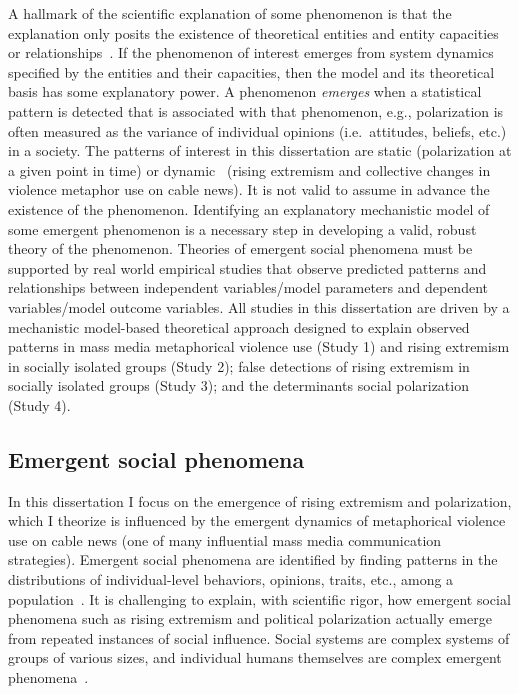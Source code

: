 \documentclass[12pt,letterpaper]{article}
\begin{document}
A hallmark of the scientific explanation of some phenomenon is that the explanation
only posits the existence of theoretical entities and entity capacities or 
relationships~\cite{Kauffman1970,Cartwright1989,Craver2006,Turner2021}. If the phenomenon of interest 
emerges from system dynamics specified by the entities and their capacities,
then the model and its theoretical basis has some explanatory power. 
A phenomenon \emph{emerges} when a statistical pattern is detected that is 
associated with that phenomenon, e.g., polarization is often measured as the
variance of individual opinions (i.e.\ attitudes, beliefs, etc.) in a society.
The patterns of interest in this dissertation are static (polarization at a given
point in time) or dynamic~\cite{Kelso1995} (rising extremism and collective changes in 
violence metaphor use on cable news).
It is not valid to assume in advance the existence of the phenomenon. Identifying
an explanatory mechanistic model of some emergent phenomenon is a necessary step
in developing a valid, robust theory of the phenomenon. Theories of emergent
social phenomena must be supported by real world empirical studies that observe predicted patterns and 
relationships between independent variables/model parameters and dependent variables/model outcome variables.
All studies in this dissertation are driven by a mechanistic model-based theoretical
approach designed to explain observed patterns in mass media metaphorical violence use (Study 1) and
rising extremism in socially isolated groups (Study 2); false detections of
rising extremism in socially isolated groups (Study 3); and the determinants social polarization (Study 4).


\subsection{Emergent social phenomena}

In this dissertation I focus on the emergence of rising extremism and polarization,
which I theorize is influenced by the emergent dynamics of metaphorical violence
use on cable news (one of many influential mass media communication strategies). 
Emergent social phenomena are identified by finding patterns in
the distributions of individual-level behaviors, opinions, traits, etc., 
among a population~\cite{Blau1974,Schelling2006}. It is challenging to
explain, with scientific rigor, how emergent social phenomena such as
rising extremism and political polarization actually 
emerge from repeated instances of social influence. Social systems are
complex systems of groups of various sizes, and individual humans themselves
are complex emergent phenomena~\cite{Kello2007,Lazer2009}. 
\end{document}
